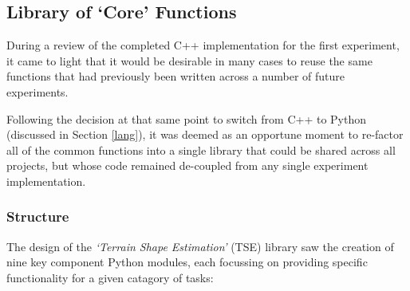 
\subsection{Library of `Core' Functions}

During a review of the completed C++ implementation for the first experiment, it came to light that it would be desirable in many cases to reuse the same functions that had previously been written across a number of future experiments. 

Following the decision at that same point to switch from C++ to Python (discussed in Section \ref{lang}), it was deemed as an opportune moment to re-factor all of the common functions into a single library that could be shared across all projects, but whose code remained de-coupled from any single experiment implementation. 

\subsubsection{Structure}

The design of the \textit{`Terrain Shape Estimation'} (TSE) library saw the creation of nine key component Python modules, each focussing on providing specific functionality for a given catagory of tasks:

